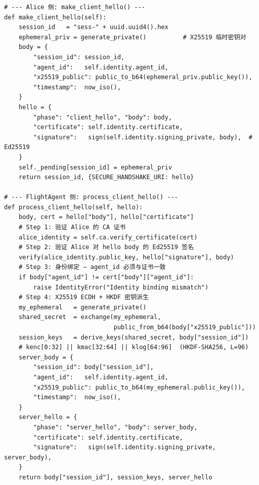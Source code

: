 \begin{lstlisting}[caption={protocol/handshake.py — ClientHello (Alice) \& ServerHello (FlightAgent)}]
# --- Alice 侧: make_client_hello() ---
def make_client_hello(self):
    session_id   = "sess-" + uuid.uuid4().hex
    ephemeral_priv = generate_private()          # X25519 临时密钥对
    body = {
        "session_id": session_id,
        "agent_id":   self.identity.agent_id,
        "x25519_public": public_to_b64(ephemeral_priv.public_key()),
        "timestamp":  now_iso(),
    }
    hello = {
        "phase": "client_hello", "body": body,
        "certificate": self.identity.certificate,
        "signature":   sign(self.identity.signing_private, body),  # Ed25519
    }
    self._pending[session_id] = ephemeral_priv
    return session_id, {SECURE_HANDSHAKE_URI: hello}

# --- FlightAgent 侧: process_client_hello() ---
def process_client_hello(self, hello):
    body, cert = hello["body"], hello["certificate"]
    # Step 1: 验证 Alice 的 CA 证书
    alice_identity = self.ca.verify_certificate(cert)
    # Step 2: 验证 Alice 对 hello body 的 Ed25519 签名
    verify(alice_identity.public_key, hello["signature"], body)
    # Step 3: 身份绑定 — agent_id 必须与证书一致
    if body["agent_id"] != cert["body"]["agent_id"]:
        raise IdentityError("Identity binding mismatch")
    # Step 4: X25519 ECDH + HKDF 密钥派生
    my_ephemeral   = generate_private()
    shared_secret  = exchange(my_ephemeral,
                              public_from_b64(body["x25519_public"]))
    session_keys   = derive_keys(shared_secret, body["session_id"])
    # kenc[0:32] || kmac[32:64] || klog[64:96]  (HKDF-SHA256, L=96)
    server_body = {
        "session_id": body["session_id"],
        "agent_id":   self.identity.agent_id,
        "x25519_public": public_to_b64(my_ephemeral.public_key()),
        "timestamp":  now_iso(),
    }
    server_hello = {
        "phase": "server_hello", "body": server_body,
        "certificate": self.identity.certificate,
        "signature":   sign(self.identity.signing_private, server_body),
    }
    return body["session_id"], session_keys, server_hello
\end{lstlisting}